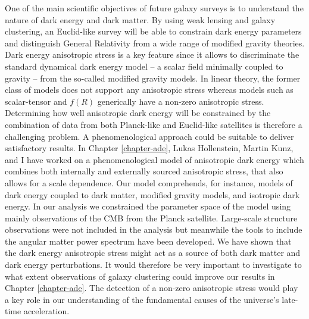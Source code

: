 One of the main scientific objectives of future galaxy surveys is to understand the nature of dark energy and dark matter. By using weak lensing and galaxy clustering, an Euclid-like survey will be able to constrain dark energy parameters and distinguish General Relativity from a wide range of modified gravity theories. Dark energy anisotropic stress is a key feature since it allows to discriminate the standard dynamical dark energy model -- a scalar field minimally coupled to gravity -- from the so-called modified gravity models. In linear theory, the former class of models does not support any anisotropic stress whereas models such as scalar-tensor and $f(R)$ generically have a non-zero anisotropic stress. Determining how well anisotropic dark energy will be constrained by the combination of data from both Planck-like and Euclid-like satellites is therefore a challenging problem. A phenomenological approach could be suitable to deliver satisfactory results. In Chapter \ref{chapter-ade}, Lukas Hollenstein, Martin Kunz, and I have worked on a phenomenological model of anisotropic dark energy which combines both internally and externally sourced anisotropic stress, that also allows for a scale dependence. Our model comprehends, for instance, models of dark energy coupled to dark matter, modified gravity models, and isotropic dark energy. In our analysis we constrained the parameter space of the model using mainly observations of the CMB from the Planck satellite. Large-scale structure observations  were not included in the analysis but meanwhile the tools to include the angular matter power spectrum have been developed. We have shown that the dark energy anisotropic stress might act as a source of both dark matter and dark energy perturbations. It would therefore be very important to investigate to what extent observations of galaxy clustering could improve our results in Chapter \ref{chapter-ade}. The detection of a non-zero anisotropic stress would play a key role in our understanding of the fundamental causes of the universe's late-time acceleration. 
